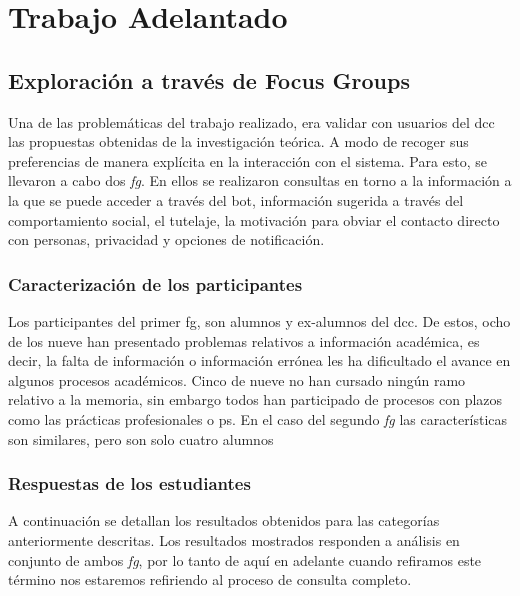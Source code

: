 \section{Trabajo Adelantado}\label{sec:tra}


\subsection{Exploración a través de Focus Groups}
    \par Una de las problemáticas del trabajo realizado, era validar con usuarios del \acrshort{dcc} las propuestas obtenidas de la investigación teórica. A modo de recoger sus preferencias de manera explícita en la interacción con el sistema. Para esto, se llevaron a cabo dos \textit{\acrlong{fg}}. En ellos se realizaron consultas en torno a la información a la que se puede acceder a través del bot, información sugerida a través del comportamiento social, el tutelaje, la motivación para obviar el contacto directo con personas, privacidad y opciones de notificación.
    
    \subsubsection{Caracterización de los participantes}
    \par Los participantes del primer \acrshort{fg}, son alumnos y ex-alumnos del \acrshort{dcc}. De estos, ocho de los nueve han presentado problemas relativos a información académica, es decir, la falta de información o información errónea les ha dificultado el avance en algunos procesos académicos. Cinco de nueve no han cursado ningún ramo relativo a la memoria, sin embargo todos han participado de procesos con plazos como las prácticas profesionales o \acrlong{ps}. En el caso del segundo \textit{\acrlong{fg}} las características son similares, pero son solo cuatro alumnos
    
    \subsubsection{Respuestas de los estudiantes}
    \par A continuación se detallan los resultados obtenidos para las categorías anteriormente descritas. Los resultados mostrados responden a análisis en conjunto de ambos \textit{\acrlong{fg}}, por lo tanto de aquí en adelante cuando refiramos este término nos estaremos refiriendo al proceso de consulta completo.
    
